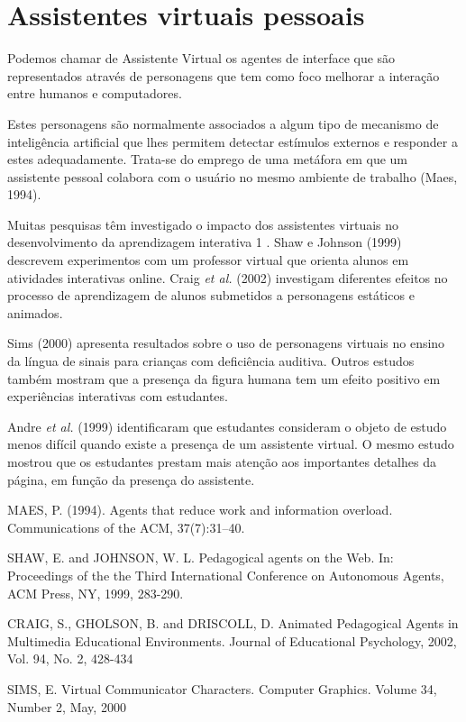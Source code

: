 \section{Assistentes virtuais pessoais} \label{s:assistentes_virtuais_pessoais}

Podemos chamar de Assistente Virtual os agentes de interface que são representados através de personagens que tem como foco melhorar a interação entre humanos e computadores.

Estes personagens são normalmente associados a algum tipo de mecanismo de inteligência artificial que lhes permitem detectar estímulos externos e responder a estes adequadamente. Trata-se do emprego de uma metáfora em que um assistente pessoal colabora com o usuário no mesmo ambiente de trabalho (Maes, 1994).

Muitas pesquisas têm investigado o impacto dos assistentes virtuais no desenvolvimento da aprendizagem interativa 1 . Shaw e Johnson (1999) descrevem experimentos com um professor virtual que orienta alunos em atividades interativas online. Craig \textit{et al.} (2002) investigam diferentes efeitos no processo de aprendizagem de alunos submetidos a personagens estáticos e animados.

Sims (2000) apresenta resultados sobre o uso de personagens virtuais no ensino da língua de sinais para crianças com deficiência auditiva. Outros estudos também mostram que a presença da figura humana tem um efeito positivo em experiências interativas com estudantes.

Andre \textit{et al.} (1999) identificaram que estudantes consideram o objeto de estudo menos difícil quando existe a presença de um assistente virtual. O mesmo estudo mostrou que os estudantes prestam mais atenção aos importantes detalhes da página, em função da presença do assistente.

MAES, P. (1994). Agents that reduce work and information overload. Communications
of the ACM, 37(7):31–40.

SHAW, E. and JOHNSON, W. L. Pedagogical agents on the Web. In: Proceedings of
the the Third International Conference on Autonomous Agents, ACM Press, NY, 1999,
283-290.

CRAIG, S., GHOLSON, B. and DRISCOLL, D. Animated Pedagogical Agents in
Multimedia Educational Environments. Journal of Educational Psychology, 2002, Vol.
94, No. 2, 428-434

SIMS, E. Virtual Communicator Characters. Computer Graphics. Volume 34, Number
2, May, 2000

